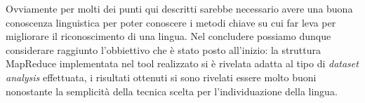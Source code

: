 \documentclass{article}
\newcommand{\MR}{MapReduce}
\begin{document}
Ovviamente per molti dei punti qui descritti sarebbe necessario avere una buona conoscenza linguistica per poter conoscere i metodi chiave su cui far leva per migliorare il riconoscimento di una lingua. Nel concludere possiamo dunque considerare raggiunto l'obbiettivo che è stato posto all'inizio: la struttura \MR{} implementata nel tool realizzato si è rivelata adatta al tipo di \textit{dataset analysis} effettuata, i risultati ottenuti si sono rivelati essere molto buoni nonostante la semplicità della tecnica scelta per l'individuazione della lingua.   

\newpage




\nocite{crawler}
\nocite{iso639}
\end{document}
